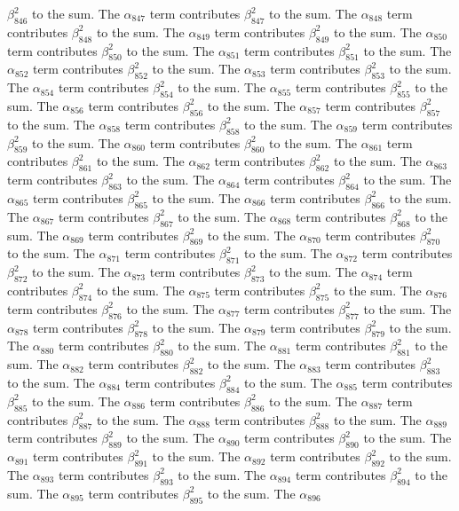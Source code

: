 \begin{lemma}
$\beta_{846}^{2}$ to the sum. The $\alpha_{847}$ term contributes $\beta_{847}^{2}$ to the sum. The $\alpha_{848}$ term contributes $\beta_{848}^{2}$ to the sum. The $\alpha_{849}$ term contributes $\beta_{849}^{2}$ to the sum. The $\alpha_{850}$ term contributes $\beta_{850}^{2}$ to the sum. The $\alpha_{851}$ term contributes $\beta_{851}^{2}$ to the sum. The $\alpha_{852}$ term contributes $\beta_{852}^{2}$ to the sum. The $\alpha_{853}$ term contributes $\beta_{853}^{2}$ to the sum. The $\alpha_{854}$ term contributes $\beta_{854}^{2}$ to the sum. The $\alpha_{855}$ term contributes $\beta_{855}^{2}$ to the sum. The $\alpha_{856}$ term contributes $\beta_{856}^{2}$ to the sum. The $\alpha_{857}$ term contributes $\beta_{857}^{2}$ to the sum. The $\alpha_{858}$ term contributes $\beta_{858}^{2}$ to the sum. The $\alpha_{859}$ term contributes $\beta_{859}^{2}$ to the sum. The $\alpha_{860}$ term contributes $\beta_{860}^{2}$ to the sum. The $\alpha_{861}$ term contributes $\beta_{861}^{2}$ to the sum. The $\alpha_{862}$ term contributes $\beta_{862}^{2}$ to the sum. The $\alpha_{863}$ term contributes $\beta_{863}^{2}$ to the sum. The $\alpha_{864}$ term contributes $\beta_{864}^{2}$ to the sum. The $\alpha_{865}$ term contributes $\beta_{865}^{2}$ to the sum. The $\alpha_{866}$ term contributes $\beta_{866}^{2}$ to the sum. The $\alpha_{867}$ term contributes $\beta_{867}^{2}$ to the sum. The $\alpha_{868}$ term contributes $\beta_{868}^{2}$ to the sum. The $\alpha_{869}$ term contributes $\beta_{869}^{2}$ to the sum. The $\alpha_{870}$ term contributes $\beta_{870}^{2}$ to the sum. The $\alpha_{871}$ term contributes $\beta_{871}^{2}$ to the sum. The $\alpha_{872}$ term contributes $\beta_{872}^{2}$ to the sum. The $\alpha_{873}$ term contributes $\beta_{873}^{2}$ to the sum. The $\alpha_{874}$ term contributes $\beta_{874}^{2}$ to the sum. The $\alpha_{875}$ term contributes $\beta_{875}^{2}$ to the sum. The $\alpha_{876}$ term contributes $\beta_{876}^{2}$ to the sum. The $\alpha_{877}$ term contributes $\beta_{877}^{2}$ to the sum. The $\alpha_{878}$ term contributes $\beta_{878}^{2}$ to the sum. The $\alpha_{879}$ term contributes $\beta_{879}^{2}$ to the sum. The $\alpha_{880}$ term contributes $\beta_{880}^{2}$ to the sum. The $\alpha_{881}$ term contributes $\beta_{881}^{2}$ to the sum. The $\alpha_{882}$ term contributes $\beta_{882}^{2}$ to the sum. The $\alpha_{883}$ term contributes $\beta_{883}^{2}$ to the sum. The $\alpha_{884}$ term contributes $\beta_{884}^{2}$ to the sum. The $\alpha_{885}$ term contributes $\beta_{885}^{2}$ to the sum. The $\alpha_{886}$ term contributes $\beta_{886}^{2}$ to the sum. The $\alpha_{887}$ term contributes $\beta_{887}^{2}$ to the sum. The $\alpha_{888}$ term contributes $\beta_{888}^{2}$ to the sum. The $\alpha_{889}$ term contributes $\beta_{889}^{2}$ to the sum. The $\alpha_{890}$ term contributes $\beta_{890}^{2}$ to the sum. The $\alpha_{891}$ term contributes $\beta_{891}^{2}$ to the sum. The $\alpha_{892}$ term contributes $\beta_{892}^{2}$ to the sum. The $\alpha_{893}$ term contributes $\beta_{893}^{2}$ to the sum. The $\alpha_{894}$ term contributes $\beta_{894}^{2}$ to the sum. The $\alpha_{895}$ term contributes $\beta_{895}^{2}$ to the sum. The $\alpha_{896}$ 
\end{lemma}

